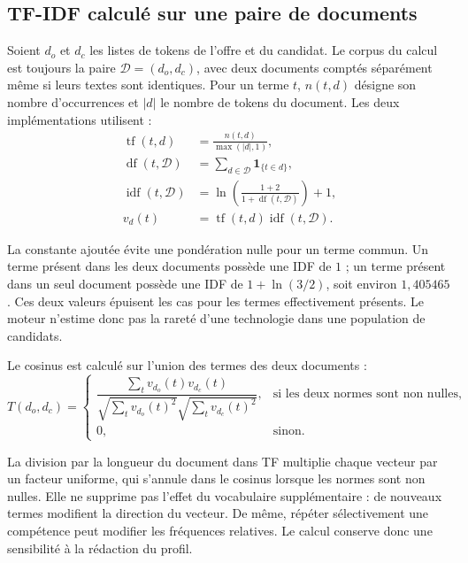\subsection{TF-IDF calculé sur une paire de documents}

Soient $d_o$ et $d_c$ les listes de tokens de l'offre et du candidat. Le corpus du calcul est toujours la paire $\mathcal{D}=(d_o,d_c)$, avec deux documents comptés séparément même si leurs textes sont identiques. Pour un terme $t$, $n(t,d)$ désigne son nombre d'occurrences et $|d|$ le nombre de tokens du document. Les deux implémentations utilisent :
\begin{align}
\operatorname{tf}(t,d) &= \frac{n(t,d)}{\max(|d|,1)},\\
\operatorname{df}(t,\mathcal{D}) &=
\sum_{d\in\mathcal{D}} \mathbf{1}_{\{t\in d\}},\\
\operatorname{idf}(t,\mathcal{D}) &=
\ln\left(\frac{1+2}{1+\operatorname{df}(t,\mathcal{D})}\right)+1,\\
v_d(t) &= \operatorname{tf}(t,d)\operatorname{idf}(t,\mathcal{D}).
\label{eq:tfidf-projet}
\end{align}

La constante ajoutée évite une pondération nulle pour un terme commun. Un terme présent dans les deux documents possède une IDF de $1$ ; un terme présent dans un seul document possède une IDF de $1+\ln(3/2)$, soit environ $1{,}405465$. Ces deux valeurs épuisent les cas pour les termes effectivement présents. Le moteur n'estime donc pas la rareté d'une technologie dans une population de candidats.

Le cosinus est calculé sur l'union des termes des deux documents :
\begin{equation}
T(d_o,d_c)=
\begin{cases}
\dfrac{\sum_t v_{d_o}(t)v_{d_c}(t)}
{\sqrt{\sum_t v_{d_o}(t)^2}\sqrt{\sum_t v_{d_c}(t)^2}},
& \text{si les deux normes sont non nulles},\\[7pt]
0, & \text{sinon}.
\end{cases}
\label{eq:cosinus-projet}
\end{equation}

La division par la longueur du document dans TF multiplie chaque vecteur par un facteur uniforme, qui s'annule dans le cosinus lorsque les normes sont non nulles. Elle ne supprime pas l'effet du vocabulaire supplémentaire : de nouveaux termes modifient la direction du vecteur. De même, répéter sélectivement une compétence peut modifier les fréquences relatives. Le calcul conserve donc une sensibilité à la rédaction du profil.

